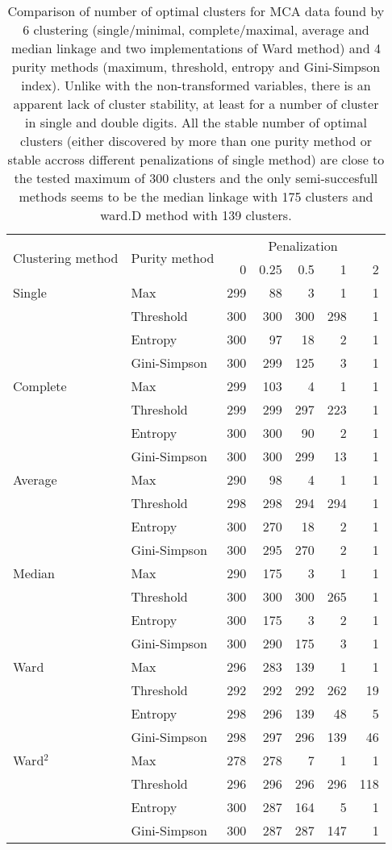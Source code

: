 \documentclass[12pt, a4paper]{article}
\begin{document}
\begin{table}
    \centering
    \begin{tabular}{llrrrrr}
    \toprule
    \multirow{2}{*}[-2pt]{Clustering method} & \multirow{2}{*}[-2pt]{Purity method} & \multicolumn{5}{c}{Penalization}\\ \cmidrule(l){3-7}
    & & 0 & 0.25 & 0.5 & 1 & 2 \\ \midrule
    Single & Max & 299 & 88 & 3 & 1 & 1\\
     & Threshold & 300 & 300 & 300 & 298 & 1\\
     & Entropy & 300 & 97 & 18 & 2 & 1\\
     & Gini-Simpson & 300 & 299 & 125 & 3 & 1\\[1em]
    Complete & Max & 299 & 103 & 4 & 1 & 1\\
     & Threshold & 299 & 299 & 297 & 223 & 1\\
     & Entropy & 300 & 300 & 90 & 2 & 1\\
     & Gini-Simpson & 300 & 300 & 299 & 13 & 1\\[1em]
    Average & Max & 290 & 98 & 4 & 1 & 1\\
     & Threshold & 298 & 298 & 294 & 294 & 1\\
     & Entropy & 300 & 270 & 18 & 2 & 1\\
     & Gini-Simpson & 300 & 295 & 270 & 2 & 1\\[1em]
    Median & Max & 290 & 175 & 3 & 1 & 1\\
     & Threshold & 300 & 300 & 300 & 265 & 1\\
     & Entropy & 300 & 175 & 3 & 2 & 1\\
     & Gini-Simpson & 300 & 290 & 175 & 3 & 1\\[1em]
    Ward & Max & 296 & 283 & 139 & 1 & 1\\
     & Threshold & 292 & 292 & 292 & 262 & 19\\
     & Entropy & 298 & 296 & 139 & 48 & 5\\
     & Gini-Simpson & 298 & 297 & 296 & 139 & 46\\[1em]
    Ward$^2$ & Max & 278 & 278 & 7 & 1 & 1\\
     & Threshold & 296 & 296 & 296 & 296 & 118\\
     & Entropy & 300 & 287 & 164 & 5 & 1\\
     & Gini-Simpson & 300 & 287 & 287 & 147 & 1\\
  \bottomrule
    \end{tabular}
    \caption{Comparison of number of optimal clusters for MCA data found by 6 clustering (single/minimal, complete/maximal, average and median linkage and two implementations of Ward method) and 4 purity methods (maximum, threshold, entropy and Gini-Simpson index). Unlike with the non-transformed variables, there is an apparent lack of cluster stability, at least for a number of cluster in single and double digits. All the stable number of optimal clusters (either discovered by more than one purity method or stable accross different penalizations of single method) are close to the tested maximum of 300 clusters and the only semi-succesfull methods seems to be the median linkage with 175 clusters and ward.D method with 139 clusters.}
\end{table}
\end{document}
